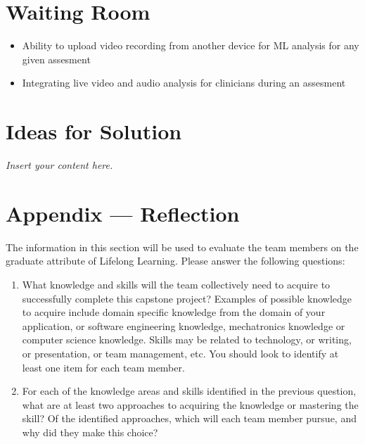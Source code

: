 \documentclass[12pt]{article}
\newcommand{\lips}{\textit{Insert your content here.}}
\begin{document}
\section{Waiting Room}
\begin{itemize}
  \item Ability to upload video recording from another device for ML analysis for any given assesment
  \item Integrating live video and audio analysis for clinicians during an assesment
\end{itemize}
\section{Ideas for Solution}
\lips

\newpage{}
\section*{Appendix --- Reflection}

The information in this section will be used to evaluate the team members on the
graduate attribute of Lifelong Learning.  Please answer the following questions:

\begin{enumerate}
  \item What knowledge and skills will the team collectively need to acquire to
  successfully complete this capstone project?  Examples of possible knowledge
  to acquire include domain specific knowledge from the domain of your
  application, or software engineering knowledge, mechatronics knowledge or
  computer science knowledge.  Skills may be related to technology, or writing,
  or presentation, or team management, etc.  You should look to identify at
  least one item for each team member.
  \item For each of the knowledge areas and skills identified in the previous
  question, what are at least two approaches to acquiring the knowledge or
  mastering the skill?  Of the identified approaches, which will each team
  member pursue, and why did they make this choice?
\end{enumerate}
\end{document}
